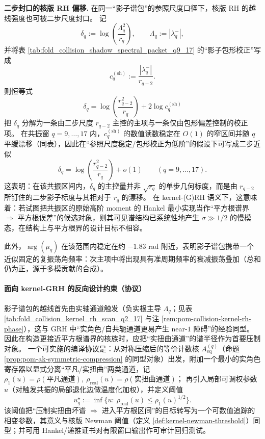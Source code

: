 \begin{remark}
\par
\textbf{二步封口的核版 RH 偏移.}
在同一“影子谱包”的参照尺度口径下，核版 RH 的越线强度也可被二步尺度封口。
记
\[
\delta_q:=\log\!\left(\frac{\Lambda_q^2}{r_q}\right),
\qquad
\Lambda_q:=|\lambda_q^-|,
\]
并将表 \ref{tab:fold_collision_shadow_spectral_packet_q9_17} 的“影子包形校正”写成
\[
c_q^{(\mathrm{sh})}:=\frac{|\lambda_q^-|}{r_{q-2}}.
\]
则恒等式
\[
\delta_q
=\log\!\left(\frac{r_{q-2}^2}{r_q}\right)+2\log c_q^{(\mathrm{sh})}
\]
把 \(\delta_q\) 分解为一条由二步尺度 \(r_{q-2}\) 主控的主项与一条仅由包形偏差控制的校正项。
在共振窗 \(q=9,\dots,17\) 内，\(c_q^{(\mathrm{sh})}\) 的数值读数稳定在 \(O(1)\) 的窄区间并随 \(q\) 平缓漂移（同表），因此在“参照尺度稳定/包形校正为低阶”的假设下可写成二步近似
\[
\delta_q=\log\!\left(\frac{r_{q-2}^2}{r_q}\right)+o(1)
\qquad(q=9,\dots,17).
\]
这表明：在该共振区间内，\(\delta_q\) 的主控量并非 \(\sqrt{r_q}\) 的单步几何标度，而是由 \(r_{q-2}\) 所钉住的二步影子标度与其相对于 \(r_q\) 的漂移。
在 kernel-(G)RH 语义下，这意味着：若试图把共振区的原始高阶 moment 的 Hankel 最小实现当作“平方根谱界 \(\Rightarrow\) 平方根误差”的候选对象，则其可见谱结构已系统性地产生 \(\sigma\gg 1/2\) 的慢模态，在结构上与平方根界的设计目标不相容。
\par
此外，\(\arg(\mu_q)\) 在该范围内稳定在约 \(-1.83\) rad 附近，表明影子谱包携带一个近似固定的复振荡角频率：次主项中将出现具有准周期频率的衰减振荡叠加（总和仍为正，源于多模贡献的合成）。
\par
\paragraph{面向 kernel-GRH 的反向设计约束（协议）}
影子谱包的越线首先由实轴通道触发（负实根主导 \(\Lambda_q\)；见表 \ref{tab:fold_collision_kernel_rh_scan_q2_17} 与注 \ref{rem:pom-collision-kernel-rh-phase}），这与 GRH 中“实角色/自共轭通道更易产生 near-\(1\) 障碍”的经验同型。
因此在构造更接近平方根谱界的核族时，应把“实扭曲通道”的谱半径作为首要压制对象。
一个可实施的编译协议是：从对称压缩后的等价计数核 \(A_{\mathrm{eq}}^{(q)}\)（命题 \ref{prop:pom-ak-symmetric-compression} 的同型对象）出发，附加一个最小的实角色寄存器以显式分离“平凡/实扭曲”两类通道，记
\(
\rho_1(u)=\rho(\text{平凡通道}),\ \rho_{\mathrm{real}}(u)=\rho(\text{实扭曲通道})
\)；
再引入局部可调权参数 \(u\)（对触发共振的局部退化边做温度化加权），并定义阈值
\[
u_q^\star:=\inf\{u:\ \rho_{\mathrm{real}}(u)\le \rho_1(u)^{1/2}\}.
\]
该阈值把“压制实扭曲坏谱 \(\Rightarrow\) 进入平方根区间”的目标转写为一个可数值追踪的相变参数，其意义与核版 Newman 阈值（定义 \ref{def:kernel-newman-threshold}）同型；并可用 Hankel/递推证书对有限窗口输出作可审计回归测试。
\end{remark}


